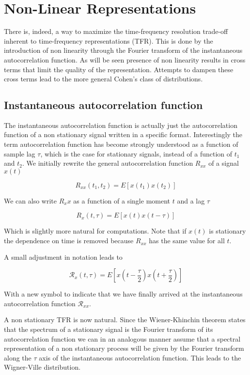 \section{Non-Linear Representations}

There is, indeed, a way to maximize the time-frequency resolution trade-off
inherent to time-frequency representations (TFR). This is done by the
introduction of non linearity through the Fourier transform of the
instantaneous autocorrelation function. As will be seen presence of non
linearity results in cross terms that limit the quality of the representation.
Attempts to dampen these cross terms lead to the more general Cohen's class of
distributions.

\subsection{Instantaneous autocorrelation function}

The instantaneous autocorrelation function is actually just the autocorrelation
function of a non stationary signal written in a specific format.
Interestingly the term autocorrelation function has become strongly understood
as a function of sample lag $\tau$, which is the case for stationary signals,
instead of a function of $t_1$ and $t_2$. We initially rewrite the general
autocorrelation function $R_{xx}$ of a signal $x(t)$

$$ R_{xx}(t_1, t_2) = E[x(t_1)x(t_2)] $$

We can also write $R_xx$ as a function of a single moment $t$ and a lag $\tau$

$$ R_{x}(t, \tau) = E[x(t)x(t-\tau)] $$

Which is slightly more natural for computations. Note that if $x(t)$ is
stationary the dependence on time is removed because $R_{xx}$ has the same
value for all $t$.

A small adjustment in notation leads to

$$ \mathcal{R}_{x}(t, \tau) = E\left[x\left(t - \frac{\tau}{2}\right)x\left(t + \frac{\tau}{2}\right)\right] $$

With a new symbol to indicate that we have finally arrived at the instantaneous
autocorrelation function $\mathcal{R}_{xx}$.

A non stationary TFR is now natural. Since the
Wiener-Khinchin theorem states that the spectrum of a stationary signal is the
Fourier transform of its autocorrelation function we can in an analogous manner
assume that a spectral representation of a non stationary process will be given
by the Fourier transform along the $\tau$ axis of the instantaneous
autocorrelation function. This leads to the Wigner-Ville distribution.

